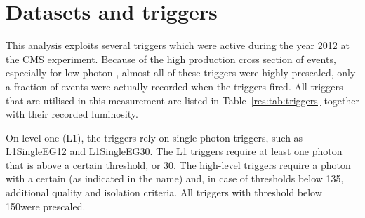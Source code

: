 \section{Datasets and triggers}
\label{res:sec:DatasetsAndTriggers}
This analysis exploits several triggers which were active during the year 2012 at the CMS experiment.
Because of the high production cross section of \GAMJET events, especially for low photon \pt, almost all of these triggers were highly prescaled, \ie only a fraction of events were actually recorded when the triggers fired.
All triggers that are utilised in this measurement are listed in Table~\ref{res:tab:triggers} together with their recorded luminosity.
\renewcommand{\arraystretch}{1.5}
\begin{table}[!b]
\centering
\caption{Single-photon triggers together with the recorded luminosity taking the prescales of the triggers into consideration.}
\label{res:tab:triggers}
\end{table}  
On level one (L1), the triggers rely on single-photon triggers, such as L1SingleEG12 and L1SingleEG30.
The L1 triggers require at least one photon that is above a certain \pt threshold, \gev or 30\gev.
The high-level triggers require a photon with a certain \pt (as indicated in the name) and, in case of thresholds below 135\gev, additional quality and isolation criteria. 
All triggers with threshold below 150\gev were prescaled.

